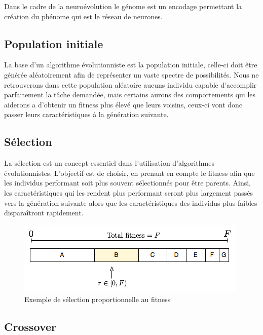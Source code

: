 \documentclass{article}
\begin{document}
Dans le cadre de la neuroévolution le génome est un encodage permettant la création du phénome qui est le réseau de neurones.

\subsection{Population initiale}

La base d'un algorithme évolutionniste est la population initiale, celle-ci doit être générée aléatoirement afin de représenter un vaste spectre de possibilités. 
Nous ne retrouverons dans cette population aléatoire aucuns individu capable d'accomplir parfaitement la tâche demandée, mais certains aurons des comportements qui les aiderons a d'obtenir un fitness plus élevé que leurs voisins, ceux-ci vont donc passer leurs caractéristiques à la génération suivante.

\subsection{Sélection}

La sélection est un concept essentiel dans l'utilisation d'algorithmes évolutionnistes. L'objectif est de choisir, en prenant en compte le fitness afin que les individus performant soit plus souvent sélectionnés pour être parents. Ainsi, les caractéristiques qui les rendent plus performant seront plus largement passés vers la génération suivante alors que les caractéristiques des individus plus faibles disparaîtront rapidement.\cite{wikifps}

\begin{figure}[h]
\begin{center}
	\includegraphics[scale=0.6]{fps.png} 
	\caption{Exemple de sélection proportionnelle au fitness\cite{wikifps}}
\end{center}
\end{figure}
\newpage

\subsection{Crossover}
\end{document}
